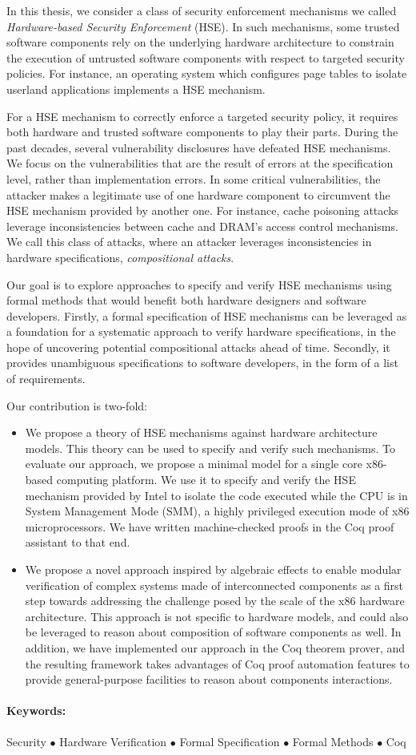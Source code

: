 In this thesis, we consider a class of security enforcement mechanisms we called
\emph{Hardware-based Security Enforcement} (HSE).
%
In such mechanisms, some trusted software components rely on the underlying
hardware architecture to constrain the execution of untrusted software
components with respect to targeted security policies.
%
For instance, an operating system which configures page tables to isolate userland
applications implements a HSE mechanism.

For a HSE mechanism to correctly enforce a targeted security policy, it requires
both hardware and trusted software components to play their parts.
%
During the past decades, several vulnerability disclosures have defeated HSE
mechanisms.
%
We focus on the vulnerabilities that are the result of errors at the
specification level, rather than implementation errors.
%
In some critical vulnerabilities, the attacker makes a legitimate use of one
hardware component to circumvent the HSE mechanism provided by another one.
%
For instance, cache poisoning attacks leverage inconsistencies between cache
and DRAM's access control mechanisms.
%
We call this class of attacks, where an attacker leverages inconsistencies in
hardware specifications, \emph{compositional attacks}.

Our goal is to explore approaches to specify and verify HSE mechanisms using
formal methods that would benefit both hardware designers and software
developers.
%
Firstly, a formal specification of HSE mechanisms can be leveraged as a
foundation for a systematic approach to verify hardware specifications, in the
hope of uncovering potential compositional attacks ahead of time.
%
Secondly, it provides unambiguous specifications to software developers, in the
form of a list of requirements.

Our contribution is two-fold:
%
\begin{itemize}
\item We propose a theory of HSE mechanisms against hardware
  architecture models.
  This theory can be used to specify and verify such mechanisms.
  To evaluate our approach, we propose a minimal model for a single core
  x86-based computing platform.
  We use it to specify and verify the HSE mechanism provided by Intel to isolate
  the code executed while the CPU is in System Management Mode (SMM), a highly
  privileged execution mode of x86 microprocessors.
  We have written machine-checked proofs in the Coq proof assistant to that
  end.
\item We propose a novel approach inspired by algebraic effects to enable
  modular verification of complex systems made of interconnected components as a first step towards addressing the challenge posed by the
  scale of the x86 hardware architecture.
  This approach is not specific to hardware models, and could also be leveraged
  to reason about composition of software components as well.
  In addition, we have implemented our approach in the Coq theorem prover, and
  the resulting framework takes advantages of Coq proof automation features to
  provide general-purpose facilities to reason about components interactions.
\end{itemize}

\paragraph{Keywords:}
%
Security $\bullet$ Hardware Verification $\bullet$ Formal Specification
$\bullet$ Formal Methods $\bullet$ Coq
